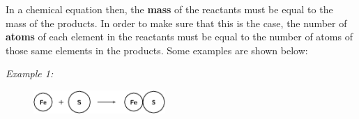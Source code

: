         \label{m38726*id63221}In a chemical equation then, the \textbf{mass} of the reactants must be equal to the mass of the products. In order to make sure that this is the case, the number of \textbf{atoms} of each element in the reactants must be equal to the number of atoms of those same elements in the products. Some examples are shown below:\par 
        \label{m38726*id63238}
          \textsl{Example 1:}
        \label{m38726*id63246}\nopagebreak\noindent{}
    
        \par 
        \label{m38726*id63273}
          
    \setcounter{subfigure}{0}


	\begin{figure}[H] %
    \begin{center}
    \label{m38726*id63276!!!underscore!!!media}\label{m38726*id63276!!!underscore!!!printimage}\includegraphics[width=5cm]{col11305.imgs/m38726_CG10C5_001.png} %
        
      \vspace{2pt}
    \vspace{.1in}
    
    \end{center}

 \end{figure}   

